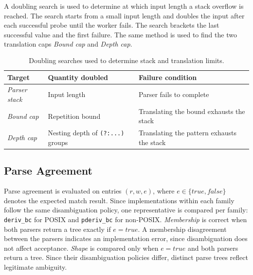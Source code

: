 A doubling search is used to determine 
at which input length a stack overflow is reached. 
The search starts from a small input length 
and doubles the input after each successful probe until the worker fails. 
The search brackets the last successful value and the first failure. 
The same method is used to find the two translation caps
\emph{Bound cap} and \emph{Depth cap}.
\begin{table}[ht]
\centering
\small
\renewcommand{\arraystretch}{1.15}
\begin{tabularx}{\textwidth}{@{}l >{\raggedright\arraybackslash}X >{\raggedright\arraybackslash}X@{}}
\textbf{Target} & \textbf{Quantity doubled} & \textbf{Failure condition} \\
\hline
\emph{Parser stack} & Input length & Parser fails to complete \\
\emph{Bound cap} & Repetition bound & Translating the bound exhausts the stack \\
\emph{Depth cap} & Nesting depth of \texttt{(?:...)} groups & Translating the pattern exhausts the stack \\
\end{tabularx}
\caption{Doubling searches used to determine stack and translation limits.}
\label{tab:eval-stack-search}
\end{table}

%
%
%

\subsection{Parse Agreement}
\label{sec:eval-criteria-agreement}

Parse agreement is evaluated on entries
$(r,w,e)$, where $e \in
\{\mathit{true},\mathit{false}\}$ denotes
the expected match result.
Since implementations within each family
follow the same disambiguation policy,
one representative is compared per family:
\texttt{deriv\_bc} for POSIX and
\texttt{pderiv\_bc} for non-POSIX.
\emph{Membership} is correct when both parsers
return a tree exactly if $e=\mathit{true}$.
A membership disagreement between the parsers
indicates an implementation error, since
disambiguation does not affect acceptance.
\emph{Shape} is compared only when
$e=\mathit{true}$ and both parsers return a tree.
Since their disambiguation policies differ,
distinct parse trees reflect legitimate ambiguity.

